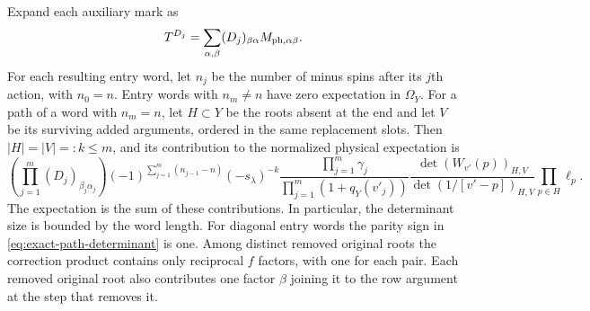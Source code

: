 \begin{corollary}\label{cor:finite-word-expansion}
Expand each auxiliary mark as
\[
 T^{D_j}=\sum_{\alpha,\beta}(D_j)_{\beta\alpha}
 M_{{\rm ph},\alpha\beta}.
\]
For each resulting entry word, let $n_j$
be the number of minus spins after its $j$th action, with $n_0=n$.
Entry words with $n_m\ne n$ have zero expectation in $\Omega_Y$.
For a path of a word with $n_m=n$, let $H\subset Y$ be the roots
absent at the end and let $V$ be its surviving added arguments, ordered
in the same replacement slots.  Then $|H|=|V|=:k\le m$, and its
contribution to the normalized physical expectation is
\begin{equation}\label{eq:exact-path-determinant}
 \left(\prod_{j=1}^m(D_j)_{\beta_j\alpha_j}\right)
 (-1)^{\sum_{j=1}^m(n_{j-1}-n)}
 (-s_\lambda)^{-k}
 \frac{\prod_{j=1}^m\gamma_j}
      {\prod_{j=1}^m(1+q_Y(v'_j))}
 \frac{\det(W_{v'}(p))_{H,V}}
      {\det(1/[v'-p])_{H,V}}
 \prod_{p\in H}\ell_p.
\end{equation}
The expectation is the sum of these contributions.  In particular,
the determinant size is bounded by the word length.  For diagonal
entry words the parity sign in \eqref{eq:exact-path-determinant} is
one.  Among distinct removed original roots the correction product
contains only reciprocal $f$ factors, with one for each pair.  Each
removed original root also contributes one factor $\beta$ joining it
to the row argument at the step that removes it.
\end{corollary}

